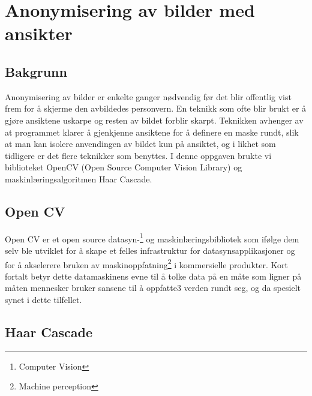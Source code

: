 \section{Anonymisering av bilder med ansikter}
\subsection{Bakgrunn}
Anonymisering av bilder er enkelte ganger nødvendig før det blir offentlig vist frem for å skjerme den avbildedes personvern. En teknikk som ofte blir brukt er å gjøre ansiktene uskarpe og resten av bildet forblir skarpt. Teknikken avhenger av at programmet klarer å gjenkjenne ansiktene\cite{wiki:FaceDetection} for å definere en maske rundt, slik at man kan isolere anvendingen av bildet kun på ansiktet, og i likhet som tidligere er det flere teknikker som benyttes. I denne oppgaven brukte vi biblioteket OpenCV\cite{cv2} (Open Source Computer Vision Library) og maskinlæringsalgoritmen Haar Cascade\cite{haar}. 



\subsection{Open CV}
Open CV er et open source datasyn-\footnote{Computer Vision\cite{datasyn}} og maskinlæringsbibliotek som ifølge dem selv\cite{cv2} ble utviklet for å skape et felles infrastruktur for datasynsapplikasjoner og for å akselerere bruken av maskinoppfatning\footnote{Machine perception\cite{wiki:machinePerception}} i kommersielle produkter. Kort fortalt betyr dette datamaskinens evne til å tolke data på en måte som ligner på måten mennesker bruker sansene til å oppfatte3 verden rundt seg\cite{wiki:machinePerception}, og da spesielt synet i dette tilfellet.  
\subsection{Haar Cascade}




